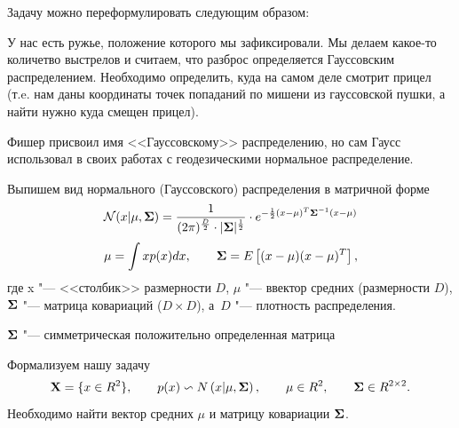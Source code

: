 Задачу можно переформулировать следующим образом: 
\begin{Zad} \label{K=1} У нас есть ружье, положение которого мы зафиксировали. Мы делаем какое-то количетво выстрелов и считаем, что разброс определяется Гауссовским распределением. Необходимо определить, куда на самом деле смотрит прицел
(т.e. нам даны координаты точек попаданий по мишени из гауссовской пушки, а найти нужно куда смещен прицел).
\end{Zad}
\begin{Zam}
Фишер присвоил имя <<Гауссовскому>> распределению, но сам Гаусс использовал в своих работах с геодезическими нормальное распределение.
\end{Zam}

Выпишем вид нормального (Гауссовского) распределения в матричной форме
\begin{equation}\label{norm}
\mathcal{N}(x|\mu, {\bf \Sigma}) =  \frac{1}{(2\pi)^{\frac{D}{2}}\cdot |{\bf {\bf \Sigma}}|^{\frac{1}{2}}}
\cdot e^{-\frac{1}{2}(x-\mu)^{T}{\bf {\bf \Sigma}}^{-1}(x-\mu)}
\end{equation}
\[
\mu = \int  x p(x)d x, \qquad {\bf {\bf \Sigma}} = E\left[(x - \mu)( x - \mu)^T \right],
\]
где x "--- <<столбик>> размерности $D$, 
$\mu$ "--- ввектор средних (размерности $D$),
${\bf {\bf \Sigma}}$ "--- матрица ковариаций ($D\times D$), 
а~$D$ "--- плотность распределения.

\begin{Zam} 
${\bf {\bf \Sigma}}$ "--- симметрическая положительно определенная матрица
\end{Zam}

Формализуем нашу задачу
\[
{\bf X} = \{ x\in R^2\}, \qquad
 p( x) \backsim N\left(x|\mu,{\bf {\bf \Sigma}}\right),\qquad 
 \mu \in R^2,\qquad 
 {\bf {\bf \Sigma}} \in R^{2 \times 2}.
\]
Необходимо найти вектор средних $\mu$ и матрицу ковариации ${\bf {\bf \Sigma}}$.




